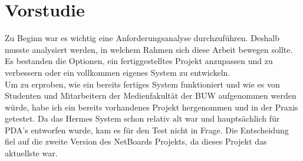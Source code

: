 \chapter{Vorstudie}\label{Vorstudie}
Zu Beginn war es wichtig eine Anforderungsanalyse durchzuführen. Deshalb musste analysiert werden, in welchem Rahmen sich diese Arbeit bewegen sollte. Es bestanden die Optionen, ein fertiggestelltes Projekt anzupassen und zu verbessern oder ein vollkommen eigenes System zu entwickeln.
\\
Um zu erproben, wie ein bereits fertiges System funktioniert und wie es von Studenten und Mitarbeitern der Medienfakultät der BUW aufgenommen werden würde, habe ich ein bereits vorhandenes Projekt hergenommen und in der Praxis getestet.
Da das Hermes System schon relativ alt war und hauptsächlich für PDA's entworfen wurde, kam es für den Test nicht in Frage.
Die Entscheidung fiel auf die zweite Version des NetBoards Projekts\cite{netboards:website}, da dieses Projekt das aktuellste war.
